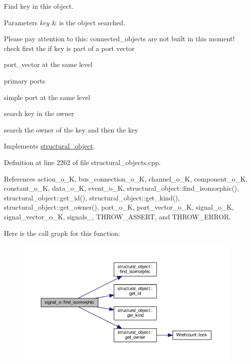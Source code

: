 Find key in this object. 


\begin{DoxyParams}{Parameters}
{\em key} & is the object searched. \\
\hline
\end{DoxyParams}
Please pay attention to this\+: connected\+\_\+objects are not built in this moment! check first the if key is part of a port vector

port\+\_\+vector at the same level

primary ports

simple port at the same level

search key in the owner

search the owner of the key and then the key 

Implements \hyperlink{classstructural__object_a87756f7dab3d9a866c81b96b88e11380}{structural\+\_\+object}.



Definition at line 2262 of file structural\+\_\+objects.\+cpp.



References action\+\_\+o\+\_\+K, bus\+\_\+connection\+\_\+o\+\_\+K, channel\+\_\+o\+\_\+K, component\+\_\+o\+\_\+K, constant\+\_\+o\+\_\+K, data\+\_\+o\+\_\+K, event\+\_\+o\+\_\+K, structural\+\_\+object\+::find\+\_\+isomorphic(), structural\+\_\+object\+::get\+\_\+id(), structural\+\_\+object\+::get\+\_\+kind(), structural\+\_\+object\+::get\+\_\+owner(), port\+\_\+o\+\_\+K, port\+\_\+vector\+\_\+o\+\_\+K, signal\+\_\+o\+\_\+K, signal\+\_\+vector\+\_\+o\+\_\+K, signals\+\_\+, T\+H\+R\+O\+W\+\_\+\+A\+S\+S\+E\+RT, and T\+H\+R\+O\+W\+\_\+\+E\+R\+R\+OR.

Here is the call graph for this function\+:
\nopagebreak
\begin{figure}[H]
\begin{center}
\leavevmode
\includegraphics[width=350pt]{db/d5c/classsignal__o_a3c49fe1a0774acfff45b3a899a852a36_cgraph}
\end{center}
\end{figure}
\mbox{\label{classsignal__o_aaab4b1d17a1ea687a8df19eef2a3eaf1}} 
